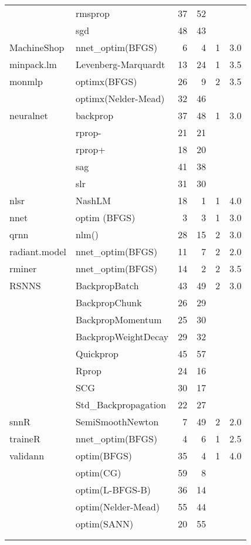 \begin{Schunk}
\begin{table}
\begin{tabular}[t]{llrrrr}
 & rmsprop & 37 & 52 &  & \\
\addlinespace
 & sgd & 48 & 43 &  & \\
MachineShop & nnet\_optim(BFGS) & 6 & 4 & 1 & 3.0\\
minpack.lm & Levenberg-Marquardt & 13 & 24 & 1 & 3.5\\
monmlp & optimx(BFGS) & 26 & 9 & 2 & 3.5\\
 & optimx(Nelder-Mead) & 32 & 46 &  & \\
\addlinespace
neuralnet & backprop & 37 & 48 & 1 & 3.0\\
 & rprop- & 21 & 21 &  & \\
 & rprop+ & 18 & 20 &  & \\
 & sag & 41 & 38 &  & \\
 & slr & 31 & 30 &  & \\
\addlinespace
nlsr & NashLM & 18 & 1 & 1 & 4.0\\
nnet & optim (BFGS) & 3 & 3 & 1 & 3.0\\
qrnn & nlm() & 28 & 15 & 2 & 3.0\\
radiant.model & nnet\_optim(BFGS) & 11 & 7 & 2 & 2.0\\
rminer & nnet\_optim(BFGS) & 14 & 2 & 2 & 3.5\\
\addlinespace
RSNNS & BackpropBatch & 43 & 49 & 2 & 3.0\\
 & BackpropChunk & 26 & 29 &  & \\
 & BackpropMomentum & 25 & 30 &  & \\
 & BackpropWeightDecay & 29 & 32 &  & \\
 & Quickprop & 45 & 57 &  & \\
\addlinespace
 & Rprop & 24 & 16 &  & \\
 & SCG & 30 & 17 &  & \\
 & Std\_Backpropagation & 22 & 27 &  & \\
snnR & SemiSmoothNewton & 7 & 49 & 2 & 2.0\\
traineR & nnet\_optim(BFGS) & 4 & 6 & 1 & 2.5\\
\addlinespace
validann & optim(BFGS) & 35 & 4 & 1 & 4.0\\
 & optim(CG) & 59 & 8 &  & \\
 & optim(L-BFGS-B) & 36 & 14 &  & \\
 & optim(Nelder-Mead) & 55 & 44 &  & \\
 & optim(SANN) & 20 & 55 &  & \\
\addlinespace
 &  &  &  &  & \\
 &  &  &  &  & \\

\end{tabular}
\end{table}
\end{Schunk}
